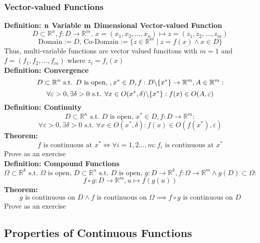 \documentclass{article}
\newcommand{\R}{\mathbb{R}}
\newcommand{\st}{\mbox{ s.t. }}
\newcommand{\0}{{\bf{0}}}
\newcommand{\bs}{\symbol{92}}
\begin{document}
\subsubsection{Vector-valued Functions}
\textbf{Definition: ${\bf{n}}$ Variable ${\bf{m}}$ Dimensional Vector-valued Function}
$$D\subset\R^n,f:D\to\R^m,\,x=(x_1,x_2,\dots,x_n)\mapsto z=(z_1,z_2,\dots,z_m)$$
$$\mbox{Domain}:=D,\,\mbox{Co-Domain}:=\{z\in\R^m\mid z=f(x)\land x\in D\}$$
Thus, multi-variable functions are vector valued funcitons with $m=1$ and $f=(f_1,f_2,\dots,f_m)$ where $z_i=f_i(x)$\\
\textbf{Definition: Convergence}
$$D\subset\R^n\st D\mbox{ is open, },x^*\in D,f:D\symbol{92}\{x^*\}\to\R^m,A\in\R^m:$$
$$\forall\varepsilon>0,\exists\delta>0\st\forall x\in O(x^*,\delta)\bs\{x^*\}:f(x)\in O(A,\varepsilon)$$
\textbf{Definition: Continuity}
$$D\subset\R^n\st D\mbox{ is open, }x^*\in D,f:D\to\R^m:$$
$$\forall\varepsilon>0,\exists\delta>0\st\forall x\in O(x^*,\delta):f(x)\in O(f(x^*),\varepsilon)$$
\textbf{Theorem:}
$$f\mbox{ is continuous at }x^*\iff\forall i=1,2\dots,m:f_i\mbox{ is continuous at }x^*$$
\null\hfill{Prove as an exercise}\\
\textbf{Definition: Compound Functions}
$$\Omega\subset\R^k\st\Omega\mbox{ is open, }D\subset\R^n\st D\mbox{ is open, }g:D\to\R^k,f:\Omega\to\R^m\land g(D)\subset\Omega:$$
$$f\circ g:D\to\R^m,u\mapsto f(g(u))$$
\textbf{Theorem:}
$$g\mbox{ is continuous on }D\land f\mbox{ is continuous on }\Omega\implies f\circ g\mbox{ is continuous on }D$$
\null\hfill{Prove as an exercise}
\subsection{Properties of Continuous Functions}
\end{document}

